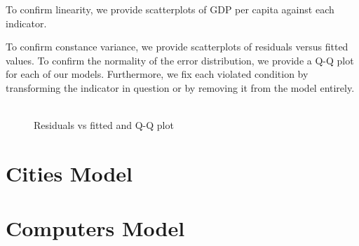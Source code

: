 \documentclass[12pt]{article}
\begin{document}
To confirm linearity, we provide scatterplots of GDP per capita against each indicator.

To confirm constance variance, we provide scatterplots of residuals versus fitted values. To confirm the normality of the error distribution, we provide a Q-Q plot for each of our models. Furthermore, we fix each violated condition by transforming the indicator in question or by removing it from the model entirely.

\begin{figure}[h!]
  \centering
  \includegraphics[width=\textwidth]{images/climate_model_conditions}
  \caption{\label{climate_model_conditions}Residuals vs fitted and Q-Q plot}
\end{figure}






\section{Cities Model}




\section{Computers Model}
\end{document}
